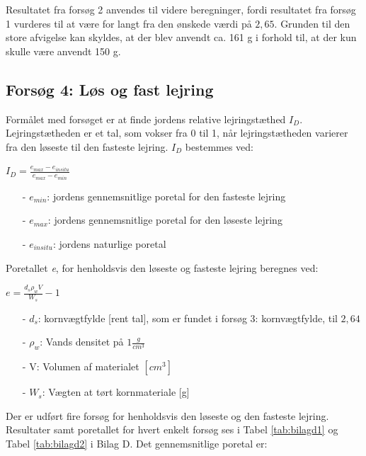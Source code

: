 Resultatet fra forsøg 2 anvendes til videre beregninger, fordi resultatet fra forsøg 1 vurderes til at være for langt fra den ønskede værdi på $2,\!65$. Grunden til den store afvigelse kan skyldes, at der blev anvendt ca. 161 g i forhold til, at der kun skulle være anvendt 150 g.

\subsection{Forsøg 4: Løs og fast lejring}
Formålet med forsøget er at finde jordens relative lejringstæthed $I_D$. Lejringstætheden er et tal, som vokser fra 0 til 1, når lejringstætheden varierer fra den løseste til den fasteste lejring.
\newline
\newline
$I_D$ bestemmes ved:

\begin{center}
	$I_D = \frac{e_{max} - e_{in situ}}{e_{max} - e_{min}}$
\end{center}

\begin{itemize}
	\item[-] $e_{min}$: jordens gennemsnitlige poretal for den fasteste lejring 
	\item[-] $e_{max}$: jordens gennemsnitlige poretal for den løseste lejring
	\item[-] $e_{in situ}$: jordens naturlige poretal 
\end{itemize}

Poretallet \textit{e}, for henholdsvis den løseste og fasteste lejring beregnes ved:

\begin{center}
	$e = \frac{d_s \rho_w  V}{W_s} - 1$
\end{center}

\begin{itemize}
	\item[-] $d_s$: kornvægtfylde [rent tal], som er fundet i forsøg 3: kornvægtfylde, til $2,\!64$ 
	\item[-] $\rho_w$: Vands densitet på $1 \frac{g}{cm^3}$
	\item[-] V: Volumen af materialet $[cm^3]$
	\item[-] $W_s$: Vægten at tørt kornmateriale [g]
\end{itemize}
 
Der er udført fire forsøg for henholdsvis den løseste og den fasteste lejring. Resultater samt poretallet for hvert enkelt forsøg ses i Tabel \ref{tab:bilagd1} og Tabel \ref{tab:bilagd2} i Bilag D.
Det gennemsnitlige poretal er:

